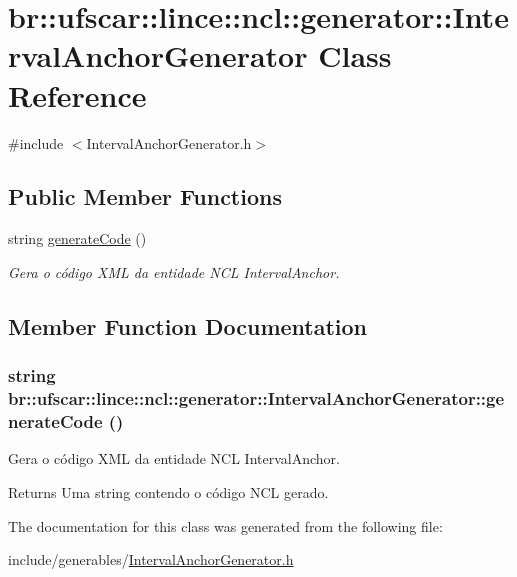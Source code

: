 \hypertarget{classbr_1_1ufscar_1_1lince_1_1ncl_1_1generator_1_1IntervalAnchorGenerator}{
\section{br::ufscar::lince::ncl::generator::IntervalAnchorGenerator Class Reference}
\label{classbr_1_1ufscar_1_1lince_1_1ncl_1_1generator_1_1IntervalAnchorGenerator}
}


{\ttfamily \#include $<$IntervalAnchorGenerator.h$>$}

\subsection*{Public Member Functions}
\begin{DoxyCompactItemize}
\item 
string \hyperlink{classbr_1_1ufscar_1_1lince_1_1ncl_1_1generator_1_1IntervalAnchorGenerator_a4a0e7e138725b5d04e79e4edf8171b22}{generateCode} ()
\begin{DoxyCompactList}\small\item\em Gera o código XML da entidade NCL IntervalAnchor. \item\end{DoxyCompactList}\end{DoxyCompactItemize}


\subsection{Member Function Documentation}
\hypertarget{classbr_1_1ufscar_1_1lince_1_1ncl_1_1generator_1_1IntervalAnchorGenerator_a4a0e7e138725b5d04e79e4edf8171b22}{
\subsubsection[{generateCode}]{\setlength{\rightskip}{0pt plus 5cm}string br::ufscar::lince::ncl::generator::IntervalAnchorGenerator::generateCode ()}}
\label{classbr_1_1ufscar_1_1lince_1_1ncl_1_1generator_1_1IntervalAnchorGenerator_a4a0e7e138725b5d04e79e4edf8171b22}


Gera o código XML da entidade NCL IntervalAnchor. 

\begin{DoxyReturn}{Returns}
Uma string contendo o código NCL gerado. 
\end{DoxyReturn}


The documentation for this class was generated from the following file:\begin{DoxyCompactItemize}
\item 
include/generables/\hyperlink{IntervalAnchorGenerator_8h}{IntervalAnchorGenerator.h}\end{DoxyCompactItemize}
